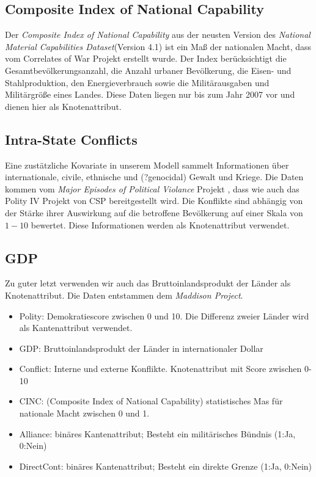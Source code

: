 \documentclass[a4paper,ngerman,oneside,titlepage,bibliography=totoc,11pt]{scrreprt}
\begin{document}
\subsection{Composite Index of National Capability}
Der \emph{Composite Index of National Capability} aus der neusten Version des \emph{National Material Capabilities Dataset}(Version 4.1)  \cite{CINC} ist ein Maß der nationalen Macht, dass vom Correlates of War Projekt erstellt wurde. Der Index berücksichtigt die Gesamtbevölkerungsanzahl, die Anzahl urbaner Bevölkerung, die Eisen- und Stahlproduktion, den Energieverbrauch  sowie die Militärausgaben und Militärgröße eines Landes. Diese Daten liegen nur bis zum Jahr 2007 vor und dienen hier als Knotenattribut.

\subsection{Intra-State Conflicts}
Eine zustätzliche Kovariate in unserem Modell sammelt Informationen über internationale, civile, ethnische und (?genocidal) Gewalt und Kriege. Die Daten kommen vom \emph{Major Episodes of Political Violance} Projekt \cite{conflict}, dass wie auch das Polity IV Projekt von CSP bereitgestellt wird. Die Konflikte sind abhängig von der Stärke ihrer Auswirkung auf die betroffene Bevölkerung auf einer Skala von $1-10$ bewertet. Diese Informationen werden als Knotenattribut verwendet.

\subsection{GDP}
Zu guter letzt verwenden wir auch das Bruttoinlandsprodukt der Länder als Knotenattribut. Die Daten entstammen dem \emph{Maddison Project}\cite{GDP}. 


\begin{itemize}
  \item Polity: Demokratiescore zwischen 0 und 10. Die Differenz zweier Länder wird als Kantenattribut verwendet.
  \item GDP: Bruttoinlandsprodukt der Länder in internationaler Dollar
  \item Conflict: Interne und externe Konflikte. Knotenattribut mit Score zwischen 0-10
  \item CINC: (Composite Index of National Capability) statistisches Mas für nationale Macht zwischen 0 und 1.
  \item Alliance: binäres Kantenattribut; Besteht ein militärisches Bündnis (1:Ja, 0:Nein)
  \item DirectCont: binäres Kantenattribut; Besteht ein direkte Grenze (1:Ja, 0:Nein)
\end{itemize}
\end{document}
